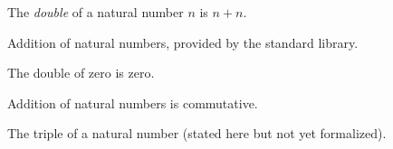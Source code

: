 
\begin{definition}\label{def:double}
  \agdaok
  The \emph{double} of a natural number $n$ is $n + n$.
\end{definition}

\begin{lemma}\label{lem:plus}
  \stdlibok
  Addition of natural numbers, provided by the standard library.
\end{lemma}

\begin{theorem}\label{thm:double-zero}
  \agdaok
  The double of zero is zero.
\end{theorem}

\begin{theorem}\label{thm:plus-comm}
  \agdaok
  Addition of natural numbers is commutative.
\end{theorem}

\begin{theorem}\label{thm:triple}
  The triple of a natural number (stated here but not yet formalized).
\end{theorem}
